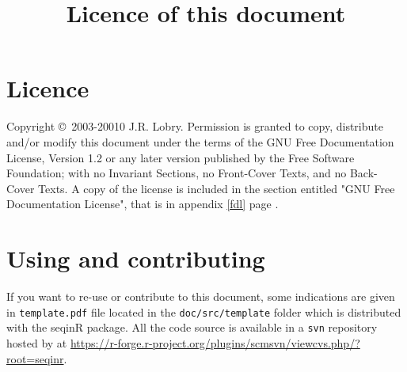\title{Licence of this document}
\section*{Licence}

    Copyright \copyright~2003-20010 J.R. Lobry.
    Permission is granted to copy, distribute and/or modify this document
    under the terms of the GNU Free Documentation License, Version 1.2
    or any later version published by the Free Software Foundation;
    with no Invariant Sections, no Front-Cover Texts, and no Back-Cover Texts.
    A copy of the license is included in the section entitled "GNU
    Free Documentation License", that is in appendix \ref{fdl} page \pageref{fdl}.

\section*{Using and contributing}

If you want to re-use or contribute to this document, some indications are
given in \texttt{template.pdf} file located in the \texttt{doc/src/template}
folder which is distributed with the seqinR package. All the code source
is available in a \texttt{svn} repository hosted by  at
\url{https://r-forge.r-project.org/plugins/scmsvn/viewcvs.php/?root=seqinr}.

